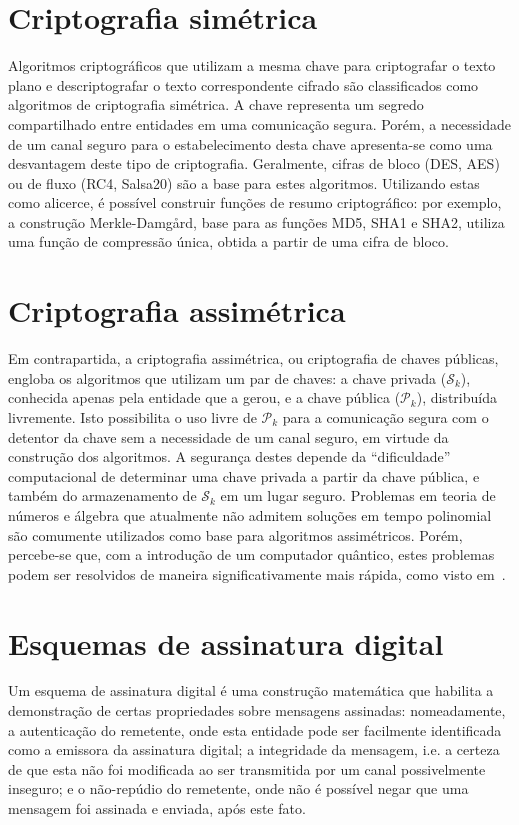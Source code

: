 \documentclass{article}
\newcommand{\pk}{$\mathcal{P}_k$}
\newcommand{\sk}{$\mathcal{S}_k$}
\begin{document}
\section{Criptografia simétrica}

Algoritmos criptográficos que utilizam a mesma chave para criptografar o
texto plano e descriptografar o texto correspondente cifrado são classificados
como algoritmos de criptografia simétrica. A chave representa um segredo
compartilhado entre entidades em uma comunicação segura. Porém, a necessidade
de um canal seguro para o estabelecimento desta chave apresenta-se como uma
desvantagem deste tipo de criptografia. Geralmente, cifras de bloco (DES, AES)
ou de fluxo (RC4, Salsa20) são a base para estes algoritmos. Utilizando estas
como alicerce, é possível construir funções de resumo criptográfico: por
exemplo, a construção Merkle-Damgård, base para as funções MD5, SHA1 e SHA2,
utiliza uma função de compressão única, obtida a partir de uma cifra de bloco.

\section{Criptografia assimétrica}

Em contrapartida, a criptografia assimétrica, ou criptografia de chaves
públicas, engloba os algoritmos que utilizam um par de chaves: a chave privada
(\sk{}), conhecida apenas pela entidade que a gerou, e a chave pública (\pk{}),
distribuída livremente. Isto possibilita o uso livre de \pk{} para a
comunicação segura com o detentor da chave sem a necessidade de um canal
seguro, em virtude da construção dos algoritmos. A segurança destes depende da
``dificuldade'' computacional de determinar uma chave privada a partir da chave
pública, e também do armazenamento de \sk{} em um lugar seguro. Problemas em
teoria de números e álgebra que atualmente não admitem soluções em tempo
polinomial são comumente utilizados como base para algoritmos assimétricos.
Porém, percebe-se que, com a introdução de um computador quântico, estes
problemas podem ser resolvidos de maneira significativamente mais rápida, como
visto em~\cite{Shor:1997:PAP:264393.264406}.

\section{Esquemas de assinatura digital}

Um esquema de assinatura digital é uma construção matemática que habilita a
demonstração de certas propriedades sobre mensagens assinadas: nomeadamente,
a autenticação do remetente, onde esta entidade pode ser facilmente
identificada como a emissora da assinatura digital; a integridade da mensagem,
i.e. a certeza de que esta não foi modificada ao ser transmitida por um canal
possivelmente inseguro; e o não-repúdio do remetente, onde não é possível negar
que uma mensagem foi assinada e enviada, após este fato.
\end{document}

